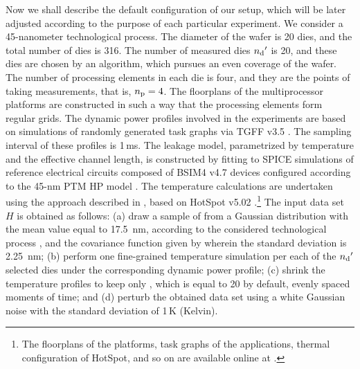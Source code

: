 Now we shall describe the default configuration of our setup, which will be
later adjusted according to the purpose of each particular experiment. We
consider a 45-nanometer technological process. The diameter of the wafer is 20
dies, and the total number of dies \nd is 316. The number of measured dies
${n_\mathrm{d}}'$ is 20, and these dies are chosen by an algorithm, which pursues an even
coverage of the wafer. The number of processing elements in each die is four,
and they are the points of taking measurements, that is, ${n_\mathrm{p}} = 4$. The
floorplans of the multiprocessor platforms are constructed in such a way that
the processing elements form regular grids. The dynamic power profiles involved
in the experiments are based on simulations of randomly generated task graphs
via TGFF v3.5 \cite{dick1998}. The sampling interval of these profiles is
1$\,$ms. The leakage model, parametrized by temperature and the effective
channel length, is constructed by fitting to SPICE simulations of reference
electrical circuits composed of BSIM4 v4.7 devices \cite{bsim} configured
according to the 45-nm PTM HP model \cite{ptm}. The temperature calculations are
undertaken using the approach described in \cite{ukhov2012}, based on HotSpot
v5.02 \cite{skadron2003}.\footnote{The floorplans of the platforms, task graphs
of the applications, thermal configuration of HotSpot, and so on are available
online at \cite{eslab2013}.} The input data set $H$ is obtained as follows: (a)
draw a sample of \g from a Gaussian distribution with the mean value equal to
17.5~nm, according to the considered technological process \cite{ptm}, and the
covariance function given by  wherein the standard
deviation is 2.25~nm; (b) perform one fine-grained temperature simulation per
each of the ${n_\mathrm{d}}'$ selected dies under the corresponding dynamic power profile;
(c) shrink the temperature profiles to keep only \ns, which is equal to 20 by
default, evenly spaced moments of time; and (d) perturb the obtained data set
using a white Gaussian noise with the standard deviation of 1$\,$K (Kelvin).

